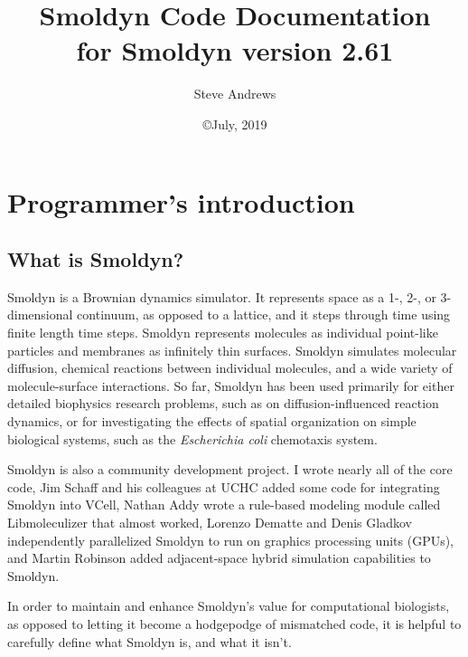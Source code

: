 \documentclass {book}
\begin{document}



\title{\textbf{Smoldyn Code Documentation} \\ \large for Smoldyn version 2.61}
\date{\copyright July, 2019}
\author{Steve Andrews}
\maketitle

\tableofcontents


\chapter{Programmer's introduction}

\section{What is Smoldyn?}

Smoldyn is a Brownian dynamics simulator.  It represents space as a 1-, 2-, or 3-dimensional continuum, as opposed to a lattice, and it steps through time using finite length time steps.   Smoldyn represents molecules as individual point-like particles and membranes as infinitely thin surfaces.  Smoldyn simulates molecular diffusion, chemical reactions between individual molecules, and a wide variety of molecule-surface interactions.  So far, Smoldyn has been used primarily for either detailed biophysics research problems, such as on diffusion-influenced reaction dynamics, or for investigating the effects of spatial organization on simple biological systems, such as the \emph{Escherichia coli} chemotaxis system.

Smoldyn is also a community development project.  I wrote nearly all of the core code, Jim Schaff and his colleagues at UCHC added some code for integrating Smoldyn into VCell, Nathan Addy wrote a rule-based modeling module called Libmoleculizer that almost worked, Lorenzo Dematte and Denis Gladkov independently parallelized Smoldyn to run on graphics processing units (GPUs), and Martin Robinson added adjacent-space hybrid simulation capabilities to Smoldyn.

In order to maintain and enhance Smoldyn's value for computational biologists, as opposed to letting it become a hodgepodge of mismatched code, it is helpful to carefully define what Smoldyn is, and what it isn't.
\end{document}
